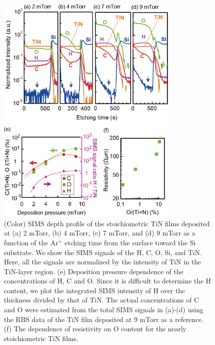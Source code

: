 \begin{figure}
\begin{center}
\includegraphics[width=89mm]{SIMS2-9.jpg}
\end{center}

\caption{(Color) SIMS depth profile of the stoichiometric TiN films deposited at (a) 2 mTorr, (b) 4 mTorr, (c) 7 mTorr, and (d) 9 mTorr as a function of the Ar$^{+}$ etching time from the surface toward the Si substrate. We show the SIMS signals of the H, C, O, Si, and TiN. Here, all the signals are normalized by the intensity of TiN in the TiN-layer region. (e) Deposition pressure dependence of the concentrations of H, C and O. Since it is difficult to determine the H content, we plot the integrated SIMS intensity of H over the thickness divided by that of TiN. The actual concentrations of C and O were estimated from the total SIMS signals in (a)-(d) using the RBS data of the TiN film deposited at 9 mTorr as a reference.  (f)  The dependence of resistivity on O content for the nearly stoichiometric TiN films.}
\label{SIMS2-9}
\end{figure}
